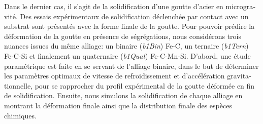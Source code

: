 \begin{otherlanguage}{french}
{Dans le dernier cas, il s'agit de la solidification d'une goutte d'acier en microgravité. 
Des essais expérimentaux de solidification déclenchée par contact avec un substrat sont présentés avec la forme finale de la goutte.
Pour pouvoir prédire la déformation de la goutte en présence de ségrégations, nous considérons trois nuances issues du même alliage:
un binaire (\emph{b1Bin}) Fe-C, un ternaire (\emph{b1Tern}) Fe-C-Si et finalement un quaternaire (\emph{b1Quat}) Fe-C-Mn-Si.
D'abord, une étude paramétrique est faite en se servant de l'alliage binaire, dans le but de déterminer les paramètres optimaux de vitesse
de refroidissement et d'accélération gravitationnelle, pour se rapprocher du profil expérimental de la goutte déformée en fin de solidification.
Ensuite, nous simulons la solidification de chaque alliage en montrant la déformation finale ainsi que la distribution finale
des espèces chimiques.  

}
\end{otherlanguage}
